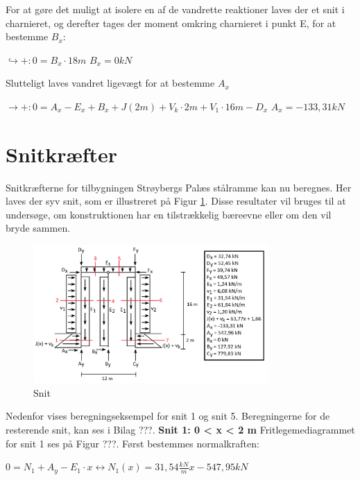 For at gøre det muligt at isolere en af de vandrette reaktioner laves der et snit i charnieret, og derefter tages der moment omkring charnieret i punkt E, for at bestemme $B_x$:
\begin{center}
	$\hookrightarrow+: 0 = B_x \cdot 18m$
	\newline
	$B_x = 0 kN$
\end{center}

Slutteligt laves vandret ligevægt for at bestemme $A_x$
\begin{center}
	$\rightarrow+: 0 = A_x - E_x + B_x + J(2m) + V_k \cdot 2m + V_1 \cdot 16 m - D_x$
	\newline
	$A_x = -133,\!31 kN$
\end{center} 

\section{Snitkræfter}
Snitkræfterne for tilbygningen Strøybergs Palæs stålramme kan nu beregnes. Her laves der syv snit, som er illustreret på Figur \ref{fig:snitbrud}. Disse resultater vil bruges til at undersøge, om konstruktionen har en tilstrækkelig bæreevne eller om den vil bryde sammen. 

\begin{figure}[H]
	\centering
	\includegraphics[width=0.8\textwidth]{billeder/snitbrud.png}
	\caption{Snit}
	\label{fig:snitbrud}
\end{figure}

Nedenfor vises beregningseksempel for snit 1 og snit 5. Beregningerne for de resterende snit, kan ses i Bilag ???. 
\newline
\newline
\textbf{Snit 1: 0 < x < 2 m}
\newline
Fritlegemediagrammet for snit 1 ses på Figur ???.
\newline
\newline
Først bestemmes normalkraften:
\begin{center}
	$0 = N_1 + A_y - E_1 \cdot x \leftrightarrow N_1(x) = 31,\!54 \frac{kN}{m} x - 547,\!95 kN $
\end{center}

